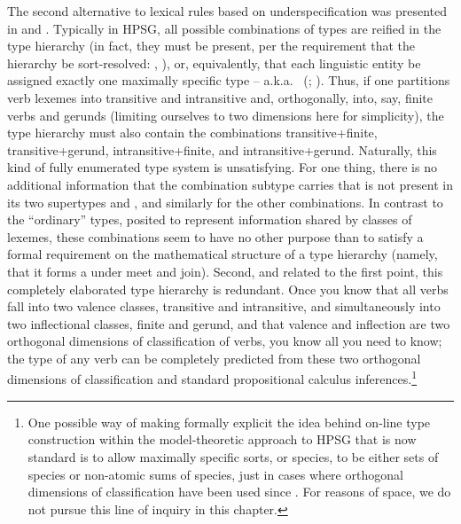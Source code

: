 \documentclass[output=paper,biblatex,babelshorthands,newtxmath,draftmode,colorlinks,citecolor=brown]{langscibook}
\begin{document}
 The second alternative to lexical rules based on underspecification
was presented in  and . Typically in HPSG, all
possible combinations of types are reified in the type hierarchy (in fact, they must be present, per
the requirement that the hierarchy be sort-resolved: \citealt{Carpenter1992},
\citealt{PollardandSag1994}), or, equivalently, that each linguistic entity be assigned exactly one
maximally specific type -- a.k.a.\  (\citealt[78]{Richter2000};
).  Thus, if one partitions verb
lexemes into transitive and intransitive and, orthogonally, into, say, finite verbs and gerunds
(limiting ourselves to two dimensions here for simplicity), the type hierarchy must also contain the
combinations transitive+finite, transitive+gerund, intransitive+finite, and
intransitive+gerund. Naturally, this kind of fully enumerated type system is unsatisfying. For one
thing, there is no additional information that the combination subtype 
carries that is not present in its two supertypes  and , and similarly
for the other combinations. In contrast to the ``ordinary'' types, posited to represent information
shared by classes of lexemes, these combinations seem to have no other purpose than to satisfy a
formal requirement on the mathematical structure of a type hierarchy (namely, that it forms a
 under meet and join).  Second, and related to the first point, this completely
elaborated type hierarchy is redundant. Once you know that all verbs fall into two valence classes,
transitive and intransitive, and simultaneously into two inflectional classes, finite and gerund,
and that valence and inflection are two orthogonal dimensions of classification of verbs, you know
all you need to know; the type of any verb can be completely predicted from these two orthogonal
dimensions of classification and standard propositional calculus inferences.\footnote{One possible
  way of making formally explicit the idea behind on-line type construction within the
  model-theoretic approach to HPSG that is now standard
  \citep{King1989,Richter2000,chapters/formal-background} is to allow maximally specific sorts, or
  species, to be either sets of species or non-atomic sums of species, just in cases where
  orthogonal dimensions of classification have been used since \citet{Flickinger1987}. For reasons
  of space, we do not pursue this line of inquiry in this chapter.}
\end{document}
